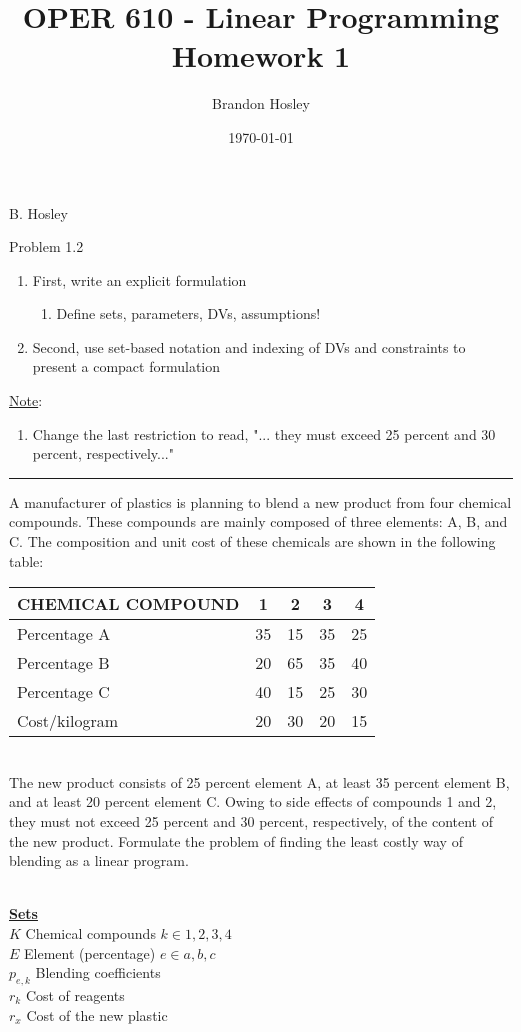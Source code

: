 \documentclass[answers]{exam}
\title{OPER 610 - Linear Programming%
	\\ Homework 1}
\author{Brandon Hosley}
\date{\today}
\begin{document}
\hspace{\fill} { B. Hosley}
\bigskip

\begin{questions}

\question 
Problem 1.2
\begin{enumerate}
	\item First, write an explicit formulation
	\begin{enumerate}
		\item Define sets, parameters, DVs, assumptions!
	\end{enumerate}
\item Second, use set-based notation and indexing of DVs and constraints to present a compact formulation
\end{enumerate}
\underline{Note}:
\begin{enumerate}
	\item Change the last restriction to read, "... they must exceed 25 percent and 30 percent, respectively..."
\end{enumerate}
\hrule
\bigskip
[1.2] A manufacturer of plastics is planning to blend a new product from four chemical compounds. These compounds are mainly composed of three elements: A, B, and C. The composition and unit cost of these chemicals are shown in the following table: \bigskip \\ 
\begin{tabular}{lcccc}
	\toprule
	CHEMICAL COMPOUND & 1 & 2 & 3 & 4 \\
	\midrule
	Percentage A  & 35 & 15 & 35 & 25 \\
	Percentage B  & 20 & 65 & 35 & 40 \\
	Percentage C  & 40 & 15 & 25 & 30 \\
	Cost/kilogram & 20 & 30 & 20 & 15 \\
	\bottomrule 
\end{tabular} \bigskip \\ 
The new product consists of 25 percent element A, at least 35 percent element B, and at least 20 percent element C. Owing to side effects of compounds 1 and 2, they must not exceed 25 percent and 30 percent, respectively, of the content of the new product. Formulate the problem of finding the least costly way of blending as a linear program.
\begin{solution} \\
	\textbf{\underline{Sets}} \\
	\(K\) Chemical compounds \(k\in{1,2,3,4}\) \\
	\(E\) Element (percentage) \(e\in{a,b,c}\) \\
	\(p_{e,k}\) Blending coefficients \\
	\(r_{k}\) Cost of reagents \\
	\(r_{x}\) Cost of the new plastic \\
	

\end{solution}
\end{questions}
\end{document}
